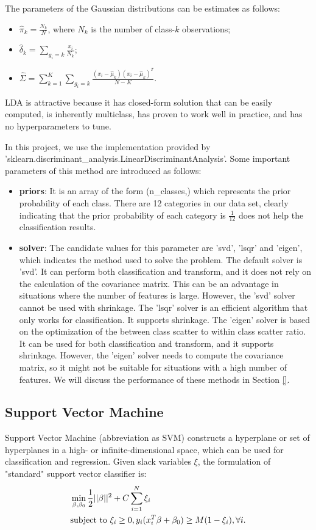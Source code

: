 \documentclass[10pt,journal,compsoc]{IEEEtran}
\begin{document}
The parameters of the Gaussian distributions can be estimates as follows:
\begin{itemize}
  \item $\hat{\pi}_k = \frac{N_k}{N}$, where $N_k$ is the number of class-$k$ observations;
  \item $\hat{\delta}_k = \sum_{g_i=k}\frac{x_i}{N_k}$;
  \item $\hat{\Sigma} = \sum_{k=1}^K\sum_{g_i=k}\frac{(x_i - \hat{\mu}_k)(x_i - \hat{\mu}_k)^T}{N-K}$.
\end{itemize}

LDA is attractive because it has closed-form solution that can be easily computed, is inherently multiclass, has proven to work well in practice, and has no hyperparameters to tune. 

In this project, we use the implementation provided by 'sklearn.discriminant\_analysis.LinearDiscriminantAnalysis'. Some important parameters of this method are introduced as follows:
\begin{itemize}
  \item \textbf{priors}: It is an array of the form (n\_classes,) which represents the prior probability of each class. There are 12 categories in our data set, clearly indicating that the prior probability of each category is $\frac{1}{12}$ does not help the classification results.
  \item \textbf{solver}: The candidate values for this parameter are 'svd', 'lsqr' and 'eigen', which indicates the method used to solve the problem. The default solver is 'svd'. It can perform both classification and transform, and it does not rely on the calculation of the covariance matrix. This can be an advantage in situations where the number of features is large. However, the 'svd' solver cannot be used with shrinkage. The 'lsqr' solver is an efficient algorithm that only works for classification. It supports shrinkage. The 'eigen' solver is based on the optimization of the between class scatter to within class scatter ratio. It can be used for both classification and transform, and it supports shrinkage. However, the 'eigen' solver needs to compute the covariance matrix, so it might not be suitable for situations with a high number of features. We will discuss the performance of these methods in Section \ref{}.%
\end{itemize}

\subsection{Support Vector Machine}
\label{subsec:support_vector_machine}
Support Vector Machine (abbreviation as SVM) constructs a hyperplane or set of hyperplanes in a high- or infinite-dimensional space, which can be used for classification and regression. Given slack variables $\xi$, the formulation of "standard" support vector classifier is:
\begin{align}
  \label{eq:svm}
  &\min_{\beta, \beta_0}\frac{1}{2}||\beta||^2 + C\sum_{i=1}^N\xi_i \\
  &{\rm subject\ to\ } \xi_i \geq 0, y_i(x_i^T\beta + \beta_0) \geq M(1-\xi_i), \forall i. \notag
\end{align}
\end{document}
